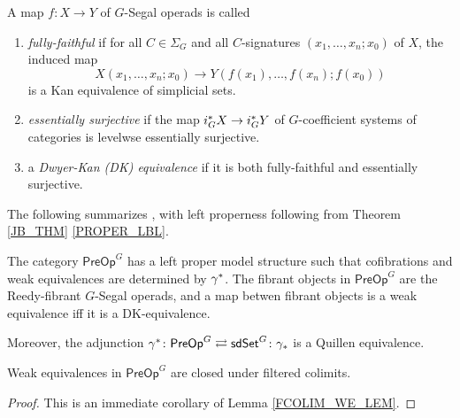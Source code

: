 \documentclass[a4paper,10pt
,draft
]{article}%
\renewcommand{\1}{\eta}%
\begin{document}
\begin{definition}
      A map $f \colon X \to Y$ of $G$-Segal operads is called
      \begin{enumerate}[label = (\roman*)]
      \item \textit{fully-faithful} if for all $C \in \Sigma_G$ and all $C$-signatures $(x_1,\dots, x_n;x_0)$ of $X$, the induced map
            \[
                  X(x_1, \dots, x_n; x_0) \to Y(f(x_1), \dots, f(x_n); f(x_0))
            \]
            is a Kan equivalence of simplicial sets.
      \item \textit{essentially surjective} if the map $i_G^{\**}X \to i_G^{\**}Y$ of $G$-coefficient systems of categories
            is levelwse essentially surjective.
      \item a \textit{Dwyer-Kan (DK) equivalence} if it is both fully-faithful and essentially surjective.
      \end{enumerate}
\end{definition}


The following summarizes \cite[Theorems 4.39, 4.42, and 5.48, and Corollary 5.51]{BP_edss},
with left properness following from Theorem \ref{JB_THM} \ref{PROPER_LBL}.
\begin{theorem}
      The category $\mathsf{PreOp}^G$ has a left proper model structure such that
      cofibrations and weak equivalences are determined by $\gamma^{\**}$.
      The fibrant objects in $\mathsf{PreOp}^G$ are the Reedy-fibrant $G$-Segal operads,
      and a map betwen fibrant objects is a weak equivalence iff it is a DK-equivalence.
      
      Moreover, the adjunction $\gamma^{\**} \colon \mathsf{PreOp}^G \rightleftarrows \mathsf{sdSet}^G \colon \gamma_{\**}$
      is a Quillen equivalence.
\end{theorem}

\begin{lemma}
      \label{FCOLIM_WE2_LEM}
      Weak equivalences in $\mathsf{PreOp}^G$ are closed under filtered colimits.
\end{lemma}
\begin{proof}
      This is an immediate corollary of Lemma \ref{FCOLIM_WE_LEM}.
\end{proof}
\end{document}
